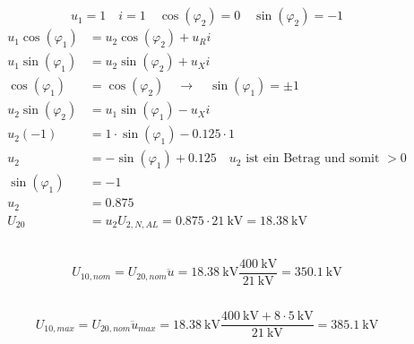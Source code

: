 \documentclass[11pt,a4paper]{scrartcl}
\newcommand{\mybr}[1]{\left(#1\right)}
\newcommand{\0}{_{\mybr{0}}}
\newcommand{\1}{_{\mybr{1}}}
\newcommand{\2}{_{\mybr{2}}}
\newcommand{\USNA}{U_{2,N,AL}}
\newcommand{\ce}{\cos\mybr{\varphi_1}}
\newcommand{\se}{\sin\mybr{\varphi_1}}
\newcommand{\cz}{\cos\mybr{\varphi_2}}
\newcommand{\sz}{\sin\mybr{\varphi_2}}
\begin{document}
\section{}
\subsection{}
\begin{equation}
u_1=1\quad i=1\quad \cz=0\quad \sz=-1
\end{equation}
\begin{align}
u_1\ce&=u_2\cz+u_R i\\
u_1\se&=u_2\sz+u_X i\\
\ce&=\cz\quad \rightarrow\quad \se = \pm 1\\
u_2\sz&=u_1\se-u_X i\\
u_2\mybr{-1}&=1\cdot\se-\num{0.125}\cdot1\\
u_2&=-\se+\num{0.125}\quad\text{$u_2$ ist ein Betrag und somit $>0$}\\
\se&=\num{-1}\\
u_2&=\num{0.875}\\
U_{20}&=u_2\USNA=\num{0.875}\cdot\SI{21}{\kilo\volt}=\SI{18.38}{\kilo\volt}
\end{align}

\subsection{}
\begin{equation}
U_{10,nom}=U_{20,nom}\ddot{u}=\SI{18.38}{\kilo\volt}\frac{\SI{400}{\kilo\volt}}{\SI{21}{\kilo\volt}}=\SI{350.1}{\kilo\volt}
\end{equation}

\subsection{}
\begin{equation}
U_{10,max}=U_{20,nom}\ddot{u}_{max}=\SI{18.38}{\kilo\volt}\frac{\SI{400}{\kilo\volt}+8\cdot\SI{5}{\kilo\volt}}{\SI{21}{\kilo\volt}}=\SI{385.1}{\kilo\volt}
\end{equation}

\section{}
\end{document}
